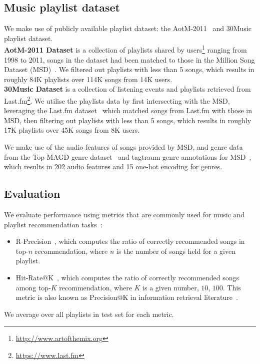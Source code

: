 \subsection{Music playlist dataset}
We make use of publicly available playlist dataset: the AotM-2011~\cite{mcfee2012hypergraph} and 30Music~\cite{30music2015} playlist dataset. \\
%
{\bf AotM-2011 Dataset} is a collection of playlists shared by users\footnote{\url{http://www.artofthemix.org}} ranging from 1998 to 2011, 
songs in the dataset had been matched to those in the Million Song Dataset (MSD)~\cite{msd2011}.
We filtered out playlists with less than 5 songs, which results in roughly 84K playlists over 114K songs from 14K users. \\
%
{\bf 30Music Dataset} is a collection of listening events and playlists retrieved from Last.fm\footnote{\url{https://www.last.fm}}.
We utilise the playlists data by first intersecting with the MSD, leveraging the Last.fm dataset~\cite{lastfmdataset} 
which matched songs from Last.fm with those in MSD, then filtering out playlists with less than 5 songs, 
which results in roughly 17K playlists over 45K songs from 8K users.

We make use of the audio features of songs provided by MSD, 
and genre data from the Top-MAGD genre dataset~\cite{schindler2012facilitating} and tagtraum genre annotations for MSD~\cite{schreiber2015improving},
which results in 202 audio features and 15 one-hot encoding for genres.



\subsection{Evaluation}
We evaluate performance using metrics that are commonly used for music and playlist recommendation 
tasks~\cite{schedl2017,hariri2012context,jannach2015beyond}:
\begin{itemize}
\item R-Precision~\cite{manning2008introIR}, which computes the ratio of correctly recommended songs in top-$n$ recommendation, 
      where $n$ is the number of songs held for a given playlist.
\item Hit-Rate@K~\cite{hariri2012context}, which computes the ratio of correctly recommended songs among top-$K$ recommendation, 
      where $K$ is a given number, \eg $10$, $100$. 
      This metric is also known as Precision@K in information retrieval literature~\cite{manning2008introIR}.
\end{itemize}
We average over all playlists in test set for each metric.


